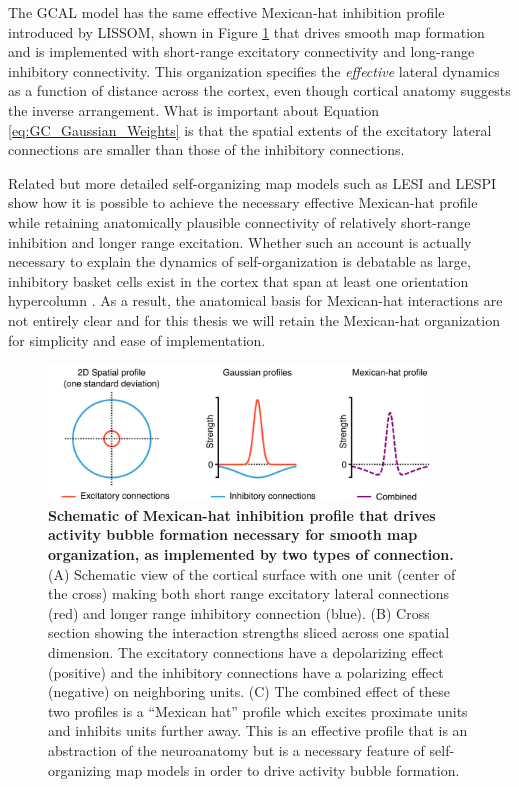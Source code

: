 \documentclass[phd,ianc,twoside]{infthesis}
\begin{document}
The GCAL model has the same effective Mexican-hat inhibition profile
introduced by LISSOM, shown in Figure \ref{fig:Mexican_hat} that drives
smooth map formation and is implemented with short-range excitatory
connectivity and long-range inhibitory connectivity. This organization
specifies the \emph{effective} lateral dynamics as a function of
distance across the cortex, even though cortical anatomy suggests the
inverse arrangement. What is important about Equation
\ref{eq:GC_Gaussian_Weights} is that the spatial extents of the
excitatory lateral connections are smaller than those of the inhibitory
connections.

Related but more detailed self-organizing map models such as LESI 
\citep{law_thesis09} and LESPI \citep{rudiger_thesis16}
show how it is possible to achieve the necessary
effective Mexican-hat profile while retaining anatomically plausible
connectivity of relatively short-range inhibition and longer range
excitation. Whether such an account is actually necessary to explain the
dynamics of self-organization is debatable as large, inhibitory basket
cells exist in the cortex that span at least one orientation hypercolumn
\citep{buzas_compneurol02}. As a result, the anatomical basis for
Mexican-hat interactions are not entirely clear \citep{kang_pnas02} and
for this thesis we will retain the Mexican-hat organization for
simplicity and ease of implementation.

\begin{figure}
\center
\includegraphics[width=0.9\textwidth]{./figures/Mexican_hat.pdf}
\caption{{\bf Schematic of Mexican-hat inhibition profile that drives
    activity bubble formation necessary for smooth map organization, as
    implemented by two types of connection.} (A) Schematic view of the
  cortical surface with one unit (center of the cross) making both short
  range excitatory lateral connections (red) and longer range inhibitory
  connection (blue). (B) Cross section showing the interaction strengths
  sliced across one spatial dimension. The excitatory connections have a
  depolarizing effect (positive) and the inhibitory connections have a
  polarizing effect (negative) on neighboring units. (C) The combined
  effect of these two profiles is a ``Mexican hat'' profile which excites
  proximate units and inhibits units further away. This is an effective
  profile that is an abstraction of the neuroanatomy but is a necessary
  feature of self-organizing map models in order to drive activity
  bubble formation.}
  \label{fig:Mexican_hat}
\end{figure}
\end{document}
